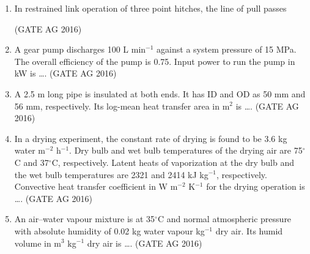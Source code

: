 \documentclass[journal]{IEEEtran}
\begin{document}
\begin{enumerate}
\item 
In restrained link operation of three point hitches, the line of pull passes
\begin{enumerate}
\end{enumerate}
\hfill(GATE AG 2016)\\

\medskip

\item 
A gear pump discharges 100 L min$^{-1}$ against a system pressure of 15 MPa. The overall efficiency of the pump is 0.75. Input power to run the pump in kW is \dots.
\hfill(GATE AG 2016)\\

\medskip

\item 
A 2.5 m long pipe is insulated at both ends. It has ID and OD as 50 mm and 56 mm, respectively. Its log-mean heat transfer area in m$^2$ is \dots.
\hfill(GATE AG 2016)\\

\medskip

\item 
In a drying experiment, the constant rate of drying is found to be 3.6 kg water m$^{-2}$ h$^{-1}$. Dry bulb and wet bulb temperatures of the drying air are 75$^\circ$C and 37$^\circ$C, respectively. Latent heats of vaporization at the dry bulb and the wet bulb temperatures are 2321 and 2414 kJ kg$^{-1}$, respectively. Convective heat transfer coefficient in W m$^{-2}$ K$^{-1}$ for the drying operation is \dots.
\hfill(GATE AG 2016)\\

\medskip

\item 
An air--water vapour mixture is at 35$^\circ$C and normal atmospheric pressure with absolute humidity of 0.02 kg water vapour kg$^{-1}$ dry air. Its humid volume in m$^3$ kg$^{-1}$ dry air is \dots.
\hfill(GATE AG 2016)\\


\end{enumerate}
\end{document}
